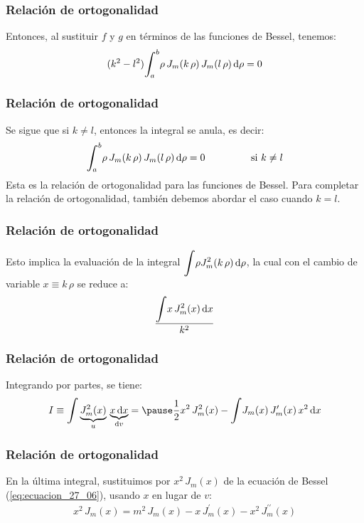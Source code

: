 \documentclass[12pt]{beamer}
\begin{document}
\begin{frame}
\frametitle{Relación de ortogonalidad}
Entonces, al sustituir $f$ y $g$ en términos de las funciones de Bessel, tenemos:
\pause
\begin{align*}
(k^{2} - l^{2}) \scaleint{6ex}_{\bs a}^{b} \rho \, J_{m} (k \, \rho) \, J_{m}(l \, \rho) \dd{\rho} = 0
\end{align*}
\end{frame}
\begin{frame}
\frametitle{Relación de ortogonalidad}
Se sigue que si $k \neq l$, entonces la integral se anula, es decir:
\pause
\begin{equation}
\scaleint{6ex}_{\bs a}^{b} \rho \, J_{m} (k \, \rho) \, J_{m}(l \, \rho) \dd{\rho} = 0 \hspace{1.5cm} \mbox{ si } k \neq l
\label{eq:ecuacion_27_20}
\end{equation}
\pause
Esta es la relación de ortogonalidad para las funciones de Bessel. \pause Para completar la relación de ortogonalidad, también debemos abordar el caso cuando $k = l$.
\end{frame}
\begin{frame}
\frametitle{Relación de ortogonalidad}
Esto implica la evaluación de la integral $\displaystyle \scaleint{6ex} \rho J_{m}^{2} ( k \, \rho) \dd{\rho}$, la cual con el cambio de variable $x \equiv k \, \rho$ se reduce a:
\pause
\begin{align*}
\dfrac{\displaystyle \scaleint{6ex} x \, J_{m}^{2} (x) \dd{x}}{k^{2}}
\end{align*}
\end{frame}
\begin{frame}
\frametitle{Relación de ortogonalidad}
Integrando por partes, se tiene:
\pause
\begin{eqnarray*}
I \equiv \scaleint{6ex}  \underbrace{J_{m}^{2} (x)}_{u} \, \underbrace{x \dd{x}}_{\dd{v}} = \pause \dfrac{1}{2} x^{2} \, J_{m}^{2} (x)
 - \scaleint{6ex} J_{m}(x) \, J_{m}^{\prime} (x) \, x^{2} \dd{x}
\end{eqnarray*}
\end{frame}
\begin{frame}
\frametitle{Relación de ortogonalidad}
En la última integral, sustituimos por $x^{2} \, J_{m} (x)$ de la ecuación de Bessel (\ref{eq:ecuacion_27_06}), usando $x$ en lugar de $v$:
\pause
\begin{align*}
x^{2} \, J_{m} (x) =  m^{2} \, J_{m}(x) - x \, J_{m}^{\prime} (x) - x^{2} \, J_{m}^{\prime \prime} (x)
\end{align*}
\end{frame}
\end{document}

